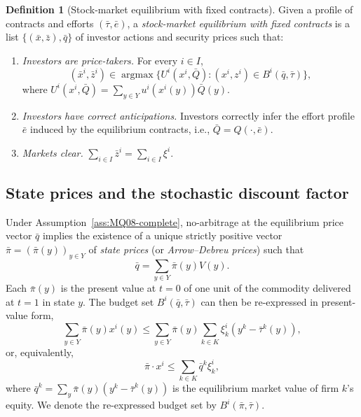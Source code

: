 \documentclass[11pt,a4paper,oneside]{book}
\def\leq{\leqslant}
\DeclareMathOperator*{\argmax}{argmax}
\theoremstyle{plain}
\theoremstyle{definition}
\newtheorem{definition}[theorem]{Definition}
\theoremstyle{remark}
\numberwithin{equation}{chapter}
\begin{document}
\begin{definition}[Stock-market equilibrium with fixed contracts]\label{def:MQ08-fixed-eq}
Given a profile of contracts and efforts $(\bar{\tau}, \bar{e})$, a \emph{stock-market equilibrium with fixed contracts} is a list $\{ (\bar{x}, \bar{z}), \bar{q} \}$ of investor actions and security prices such that:
\begin{enumerate}
  \item[(a)] \emph{Investors are price-takers.}
  For every $i \in I$,
  \begin{equation*}
    (\bar{x}^i, \bar{z}^i) \in \argmax \bigl\{ U^i(x^i, \bar{Q}) \colon (x^i, z^i) \in B^i(\bar{q}, \bar{\tau}) \bigr\},
  \end{equation*}
  where $U^i(x^i, \bar{Q}) = \sum_{y \in Y} u^i(x^i(y)) \bar{Q}(y)$.
  \item[(b)] \emph{Investors have correct anticipations.}
  Investors correctly infer the effort profile $\bar{e}$ induced by the equilibrium contracts, i.e., $\bar{Q} = Q(\cdot, \bar{e})$.
  \item[(c)] \emph{Markets clear.}
  $\sum_{i \in I} \bar{z}^i = \sum_{i \in I} \xi^i$.
\end{enumerate}
\end{definition}

\subsection{State prices and the stochastic discount factor}

Under Assumption~\ref{ass:MQ08-complete}, no-arbitrage at the equilibrium price vector $\bar{q}$ implies the existence of a unique strictly positive vector $\bar{\pi} = (\bar{\pi}(y))_{y \in Y}$ of \emph{state prices} (or \emph{Arrow--Debreu prices}) such that
\begin{equation}\label{eq:MQ08-state-prices}
  \bar{q} = \sum_{y \in Y} \bar{\pi}(y) V(y).
\end{equation}
Each $\bar{\pi}(y)$ is the present value at $t=0$ of one unit of the commodity delivered at $t=1$ in state $y$.
The budget set $B^i(\bar{q}, \bar{\tau})$ can then be re-expressed in present-value form,
\begin{equation}\label{eq:budget-PV}
  \sum_{y \in Y} \bar{\pi}(y) x^i(y)
  \leq
  \sum_{y \in Y} \bar{\pi}(y) \sum_{k \in K} \xi^i_k (y^k - \bar{\tau}^k(y)),
\end{equation}
or, equivalently,
\begin{equation*}
  \bar{\pi} \cdot x^i \leq \sum_{k \in K} \bar{q}^k \xi^i_k,
\end{equation*}
where $\bar{q}^k = \sum_{y} \bar{\pi}(y) (y^k - \bar{\tau}^k(y))$ is the equilibrium market value of firm $k$'s equity.
We denote the re-expressed budget set by $B^i(\bar{\pi}, \bar{\tau})$.
\end{document}
